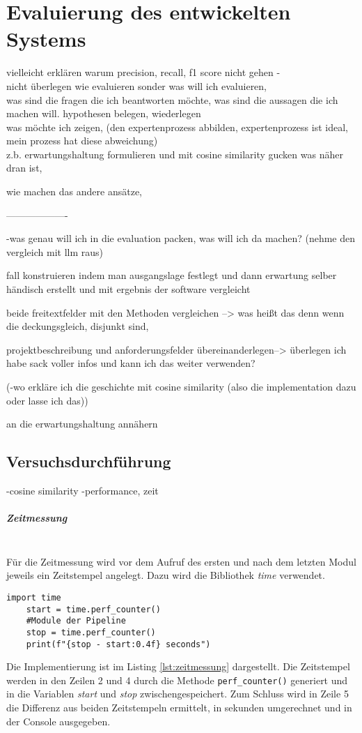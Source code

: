 \chapter{Evaluierung des entwickelten Systems}
\label{chap:evaluation}

vielleicht erklären warum precision, recall, f1 score nicht gehen -\\

nicht überlegen wie evaluieren sonder was will ich evaluieren,\\
was sind die fragen die ich beantworten möchte, was sind die aussagen die ich machen will. hypothesen belegen, wiederlegen\\
was möchte ich zeigen, (den expertenprozess abbilden, expertenprozess ist ideal, mein prozess hat diese abweichung)\\

z.b. erwartungshaltung formulieren und mit cosine similarity gucken was näher dran ist,

wie machen das andere ansätze,

-------------------

-was genau will ich in die evaluation packen, was will ich da machen? (nehme den vergleich mit llm raus)

fall konstruieren indem man ausgangslage festlegt und dann erwartung selber händisch erstellt und mit ergebnis der software vergleicht

beide freitextfelder mit den Methoden vergleichen --> was heißt das denn wenn die deckungsgleich, disjunkt sind,  

projektbeschreibung und anforderungsfelder übereinanderlegen--> überlegen ich habe sack voller infos und kann ich das weiter verwenden? 

(-wo erkläre ich die geschichte mit cosine similarity (also die implementation dazu oder lasse ich das))

an die erwartungshaltung annähern

\section{Versuchsdurchführung}
-cosine similarity
-performance, zeit

\paragraph{Zeitmessung}\mbox{}\\
Für die Zeitmessung wird vor dem Aufruf des ersten und nach dem letzten Modul jeweils ein Zeitstempel angelegt. Dazu wird die Bibliothek \emph{time} verwendet.
\begin{lstlisting}[caption={Implementation der Zeitmessung}, label=lst:zeitmessung]
	import time
	start = time.perf_counter()
	#Module der Pipeline
	stop = time.perf_counter()
	print(f"{stop - start:0.4f} seconds")
\end{lstlisting}
Die Implementierung ist im Listing \ref{lst:zeitmessung} dargestellt. Die Zeitstempel werden in den Zeilen 2 und 4 durch die Methode \lstinline{perf_counter()}
generiert und in die Variablen \emph{start} und \emph{stop} zwischengespeichert. Zum Schluss wird in Zeile 5 die Differenz aus beiden Zeitstempeln ermittelt, in sekunden umgerechnet und in der Console ausgegeben.
